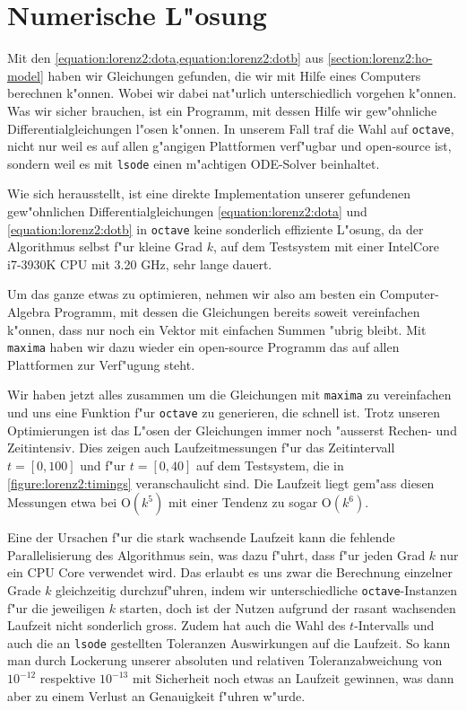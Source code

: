\section{Numerische L"osung\label{section:lorenz2:numeric-solution}}
Mit den \cref{equation:lorenz2:dota,equation:lorenz2:dotb} aus 
\cref{section:lorenz2:ho-model} haben wir Gleichungen gefunden, die wir mit 
Hilfe eines Computers berechnen k"onnen. Wobei wir dabei nat"urlich 
unterschiedlich vorgehen k"onnen. Was wir sicher brauchen, ist ein Programm, 
mit dessen Hilfe wir gew"ohnliche Differentialgleichungen l"osen k"onnen. In 
unserem Fall traf die Wahl auf \texttt{octave}, nicht nur weil es auf allen 
g"angigen Plattformen verf"ugbar und open-source ist, sondern weil es mit 
\texttt{lsode} einen m"achtigen  ODE-Solver beinhaltet.

Wie sich herausstellt, ist eine direkte Implementation unserer gefundenen 
gew"ohnlichen Differentialgleichungen \cref{equation:lorenz2:dota} und 
\cref{equation:lorenz2:dotb} in \texttt{octave} keine sonderlich effiziente 
L"osung, da der Algorithmus selbst f"ur kleine Grad $k$, auf dem Testsystem mit 
einer Intel\textregistered Core\texttrademark\, i7-3930K CPU mit 3.20 GHz, sehr 
lange dauert.

Um das ganze etwas zu optimieren, nehmen wir also am besten ein 
Computer-Algebra Programm, mit dessen die Gleichungen bereits soweit 
vereinfachen k"onnen, dass nur noch ein Vektor mit einfachen Summen "ubrig 
bleibt. Mit \texttt{maxima} haben wir dazu wieder ein open-source Programm das 
auf allen Plattformen zur Verf"ugung steht.

Wir haben jetzt alles zusammen um die Gleichungen mit \texttt{maxima} zu 
vereinfachen und uns eine Funktion f"ur \texttt{octave} zu generieren, die 
schnell ist. Trotz unseren Optimierungen ist das L"osen der 
Gleichungen immer noch "ausserst Rechen- und Zeitintensiv. Dies zeigen auch 
Laufzeitmessungen f"ur das Zeitintervall $t = [0,100]$ und f"ur $t = [0,40]$ 
auf dem Testsystem, die in \cref{figure:lorenz2:timings} veranschaulicht sind. 
Die Laufzeit liegt gem"ass diesen Messungen etwa bei $\text{O}(k^5)$ mit einer 
Tendenz zu sogar $\text{O}(k^6)$.

Eine der Ursachen f"ur die stark wachsende Laufzeit kann die fehlende 
Parallelisierung des Algorithmus sein, was dazu f"uhrt, dass f"ur jeden Grad 
$k$ nur ein CPU Core verwendet wird. Das erlaubt es uns zwar die Berechnung 
einzelner Grade $k$ gleichzeitig durchzuf"uhren, indem wir unterschiedliche 
\texttt{octave}-Instanzen f"ur die jeweiligen $k$ starten, doch ist der Nutzen 
aufgrund der rasant wachsenden Laufzeit nicht sonderlich gross. Zudem hat auch 
die Wahl des $t$-Intervalls und auch die an \texttt{lsode} gestellten 
Toleranzen Auswirkungen auf die Laufzeit. So kann man durch Lockerung unserer 
absoluten und relativen Toleranzabweichung von $10^{-12}$ respektive $10^{-13}$ 
mit Sicherheit noch etwas an Laufzeit gewinnen, was dann aber zu einem Verlust 
an Genauigkeit f"uhren w"urde.

